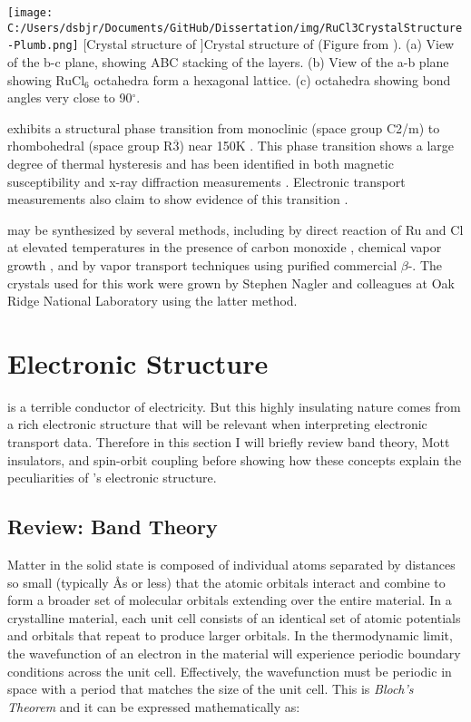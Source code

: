\begin{centering}
\texttt{[image: C:/Users/dsbjr/Documents/GitHub/Dissertation/img/RuCl3CrystalStructure-Plumb.png]}
  \captionsetup{width=0.75\textwidth}
  [Crystal structure of \ruclnospace]{Crystal structure of \rucl (Figure from \cite{Plumb2014}). (a) View of the b-c plane, showing ABC stacking of the layers. (b) View of the a-b plane showing RuCl$_{6}$ octahedra form a hexagonal lattice. (c) \rucl octahedra showing bond angles very close to 90$^{\circ}$.} 
  \label{fig:RuCl3CrystStruct-1}
\end{centering}

\rucl exhibits a structural phase transition from monoclinic (space group C2/m) to rhombohedral (space group R$\overline{3}$) near 150K \cite{Glamazda2017}. This phase transition shows a large degree of thermal hysteresis and has been identified in both magnetic susceptibility and x-ray diffraction measurements \cite{Park2016}. Electronic transport measurements also claim to show evidence of this transition \cite{Mashhadi2018}.

\rucl may be synthesized by several methods, including by direct reaction of Ru and Cl at elevated temperatures in the presence of carbon monoxide \cite{Binotto1971}, chemical vapor growth \cite{Gronke2018}, and by vapor transport techniques using purified commercial $\beta$-\ruclnospace \cite{Cao2016}. The \rucl crystals used for this work were grown by Stephen Nagler and colleagues at Oak Ridge National Laboratory using the latter method.

\section{Electronic Structure}

\rucl is a terrible conductor of electricity. But this highly insulating nature comes from a rich electronic structure that will be relevant when interpreting electronic transport data. Therefore in this section I will briefly review band theory, Mott insulators, and spin-orbit coupling before showing how these concepts explain the peculiarities of \ruclnospace 's electronic structure.

\subsection{Review: Band Theory}

Matter in the solid state is composed of individual atoms separated by distances so small (typically \AA s or less) that the atomic orbitals interact and combine to form a broader set of molecular orbitals extending over the entire material. In a crystalline material, each unit cell consists of an identical set of atomic potentials and orbitals that repeat to produce larger orbitals. In the thermodynamic limit, the wavefunction of an electron in the material will experience periodic boundary conditions across the unit cell. Effectively, the wavefunction must be periodic in space with a period that matches the size of the unit cell. This is \textit{Bloch's Theorem} and it can be expressed mathematically as:

